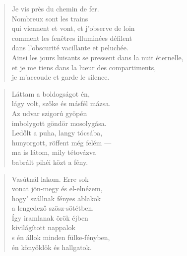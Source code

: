 \bigskip



\begin{verse}
  Je vis près du chemin de fer. \\
  Nombreux sont les trains \\
  qui viennent et vont, et j'observe de loin \\
  comment les fenêtres illuminées défilent \\
  dans l'obscurité vacillante et peluchée. \\
  Ainsi les jours luisants se pressent dans la nuit éternelle, \\
  et je me tiens dans la lueur des compartiments,\hspace*{-4mm} \\
  je m'accoude et garde le silence.
\end{verse}

\newpage

\vspace*{-15mm}
\centeredornament



\begin{verse}
  Láttam a boldogságot én, \\
  lágy volt, szőke és másfél mázsa. \\
  Az udvar szigorú gyöpén \\
  imbolygott göndör mosolygása. \\
  Ledőlt a puha, langy tócsába, \\
  hunyorgott, röffent még felém --- \\
  ma is látom, mily tétovázva \\
  babrált pihéi közt a fény.
\end{verse}

\bigskip


\begin{verse}
  Vasútnál lakom. Erre sok \\
  vonat jön-megy és el-elnézem, \\
  hogy' szállnak fényes ablakok \\
  a lengedező szösz-sötétben. \\
  Így iramlanak örök éjben \\
  kivilágított nappalok \\
  s én állok minden fülke-fényben, \\
  én könyöklök és hallgatok.
\end{verse}
